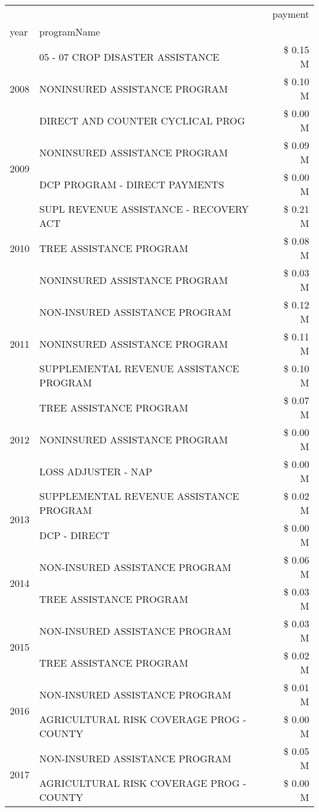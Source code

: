 \begin{tabular}{llr}
\toprule
 &  & payment \\
year & programName &  \\
\midrule
\multirow[t]{3}{*}{2008} & 05 - 07 CROP DISASTER ASSISTANCE & \$ 0.15 M \\
 & NONINSURED ASSISTANCE PROGRAM & \$ 0.10 M \\
 & DIRECT AND COUNTER CYCLICAL PROG & \$ 0.00 M \\
\cline{1-3}
\multirow[t]{2}{*}{2009} & NONINSURED ASSISTANCE PROGRAM & \$ 0.09 M \\
 & DCP PROGRAM - DIRECT PAYMENTS & \$ 0.00 M \\
\cline{1-3}
\multirow[t]{3}{*}{2010} & SUPL REVENUE ASSISTANCE - RECOVERY ACT & \$ 0.21 M \\
 & TREE ASSISTANCE PROGRAM & \$ 0.08 M \\
 & NONINSURED ASSISTANCE PROGRAM & \$ 0.03 M \\
\cline{1-3}
\multirow[t]{3}{*}{2011} & NON-INSURED ASSISTANCE PROGRAM & \$ 0.12 M \\
 & NONINSURED ASSISTANCE PROGRAM & \$ 0.11 M \\
 & SUPPLEMENTAL REVENUE ASSISTANCE PROGRAM & \$ 0.10 M \\
\cline{1-3}
\multirow[t]{3}{*}{2012} & TREE ASSISTANCE PROGRAM & \$ 0.07 M \\
 & NONINSURED ASSISTANCE PROGRAM & \$ 0.00 M \\
 & LOSS ADJUSTER - NAP & \$ 0.00 M \\
\cline{1-3}
\multirow[t]{2}{*}{2013} & SUPPLEMENTAL REVENUE ASSISTANCE PROGRAM & \$ 0.02 M \\
 & DCP - DIRECT & \$ 0.00 M \\
\cline{1-3}
\multirow[t]{2}{*}{2014} & NON-INSURED ASSISTANCE PROGRAM & \$ 0.06 M \\
 & TREE ASSISTANCE PROGRAM & \$ 0.03 M \\
\cline{1-3}
\multirow[t]{2}{*}{2015} & NON-INSURED ASSISTANCE PROGRAM & \$ 0.03 M \\
 & TREE ASSISTANCE PROGRAM & \$ 0.02 M \\
\cline{1-3}
\multirow[t]{2}{*}{2016} & NON-INSURED ASSISTANCE PROGRAM & \$ 0.01 M \\
 & AGRICULTURAL RISK COVERAGE PROG - COUNTY & \$ 0.00 M \\
\cline{1-3}
\multirow[t]{2}{*}{2017} & NON-INSURED ASSISTANCE PROGRAM & \$ 0.05 M \\
 & AGRICULTURAL RISK COVERAGE PROG - COUNTY & \$ 0.00 M \\

\end{tabular}
